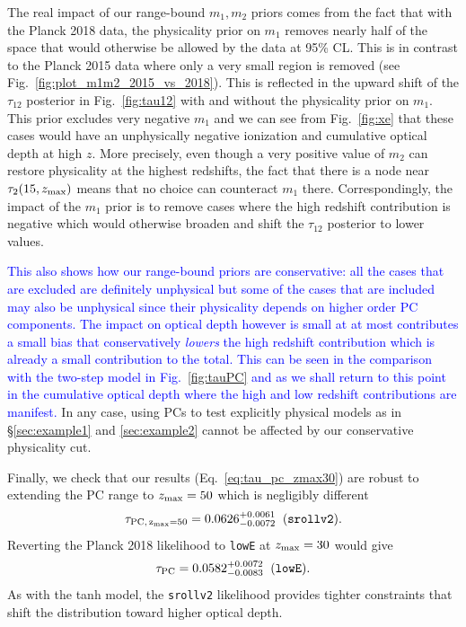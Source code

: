 \documentclass[prd,twocolumn,amsmath,amssymb,floatfix,superscriptaddress,nofootinbib]{revtex4-1}
\newcommand{\zmax}{z_{\rm max}}
\newcommand{\beq}{\begin{equation}}
\newcommand{\eeq}{\end{equation}}
\newcommand{\wh}[1]{\textcolor{blue}{#1}}
\newcommand{\ch}[1]{\textcolor{red}{#1}}
\begin{document}
{The real impact of our range-bound $m_1,m_2$ priors comes from the fact that with the Planck 2018 data, the physicality prior on $m_1$
removes nearly half of the space that would otherwise be allowed by the
data at 95\% CL.  This is in contrast to the Planck 2015 data where only a very small region is removed (see Fig.~\ref{fig:plot_m1m2_2015_vs_2018}).  
This is reflected in the upward shift of the $\tau_{12}$ posterior in Fig.~\ref{fig:tau12} with and without the physicality prior on $m_1$.   This prior excludes very negative $m_1$ and we can see from Fig.~\ref{fig:xe} that these cases would have an unphysically negative ionization and cumulative optical depth at high $z$.  More precisely, even though a very positive value 
of $m_2$ can restore physicality at the highest redshifts, the fact that there is a node near $\tau_2(15,z_{\rm max})$ means that no choice can counteract $m_1$ there.  
Correspondingly, the impact of the $m_1$ prior is to remove
cases where the high redshift contribution is negative which would otherwise broaden and shift the $\tau_{12}$ posterior to lower values.

\wh{
This also shows how our range-bound priors 
are conservative: all the cases that are excluded are definitely unphysical but some of the cases that are included
may also be unphysical since their physicality depends on higher order PC components.  The impact on optical depth  however is small at at most contributes a small bias that conservatively {\it lowers} the high redshift contribution which is already a small contribution to the total.  
This can be seen  in the comparison with the two-step model 
in Fig.~\ref{fig:tauPC} and as we shall return to this point in the cumulative optical depth where the high and low redshift contributions are manifest.}
In any case, using PCs to 
test explicitly physical models as in \S \ref{sec:example1} and
\ref{sec:example2} cannot be affected by our conservative physicality
cut.

Finally, we check that our results (Eq.~\ref{eq:tau_pc_zmax30}) are robust to
 extending the PC
range to
$z_{\rm max}=50$ which is negligibly different
\beq
\tau_{\rm PC,\, \zmax=50} = 0.0626^{+0.0061}_{-0.0072}\;\; (\texttt{srollv2}).
\eeq
Reverting the Planck 2018 likelihood to \texttt{lowE} at $z_{\rm max}=30$ would give
\beq
\tau_{\rm PC} = 0.0582 ^{+0.0072}_{-0.0083}\;\; (\texttt{lowE}).
\eeq
As with the tanh model, the \texttt{srollv2} likelihood provides tighter constraints that shift the distribution toward higher optical depth.










}
\end{document}
